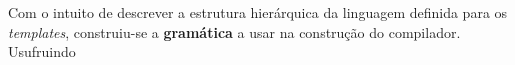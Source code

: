 \documentclass[../relatorio.tex]{subfiles}
\begin{document}
Com o intuito de descrever a estrutura hierárquica da linguagem
definida para os \textit{templates}, construiu-se a \textbf{gramática} 
a usar na construção do compilador. 
Usufruindo 
\end{document}
